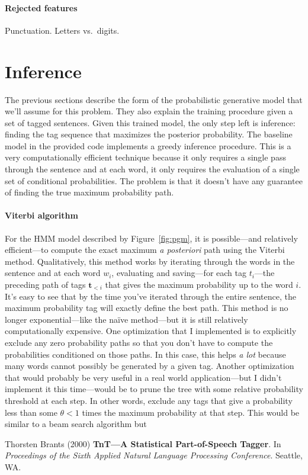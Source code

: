 \documentclass[11pt]{article}
\newcommand{\fig}[1]{Figure~\ref{fig:#1}}
\newcommand{\bvec}[1]{\ensuremath{\boldsymbol{#1}}}
\begin{document}
\paragraph{Rejected features}
Punctuation. Letters vs.\ digits.

\section{Inference}

The previous sections describe the form of the probabilistic generative model
that we'll assume for this problem.
They also explain the training procedure given a set of tagged sentences.
Given this trained model, the only step left is inference: finding the tag
sequence that maximizes the posterior probability.
The baseline model in the provided code implements a greedy inference
procedure.
This is a very computationally efficient technique because it only requires a
single pass through the sentence and at each word, it only requires the
evaluation of a single set of conditional probabilities.
The problem is that it doesn't have any guarantee of finding the true maximum
probability path.

\paragraph{Viterbi algorithm}
For the HMM model described by \fig{pgm}, it is possible---and relatively
efficient---to compute the exact maximum \emph{a posteriori} path using the
Viterbi method.
Qualitatively, this method works by iterating through the words in the
sentence and at each word $w_i$, evaluating and saving---for each tag
$t_i$---the preceding path of tags $\bvec{t}_{<i}$ that gives the maximum
probability up to the word $i$.
It's easy to see that by the time you've iterated through the entire sentence,
the maximum probability tag will exactly define the best path.
This method is no longer exponential---like the na\"ive method---but it is
still relatively computationally expensive.
One optimization that I implemented is to explicitly exclude any zero
probability paths so that you don't have to compute the probabilities
conditioned on those paths.
In this case, this helps \emph{a lot} because many words cannot possibly be
generated by a given tag.
Another optimization that would probably be very useful in a real world
application---but I didn't implement it this time---would be to prune the tree
with some relative probability threshold at each step.
In other words, exclude any tags that give a probability less than some
$\theta < 1$ times the maximum probability at that step.
This would be similar to a beam search algorithm but

\begin{thebibliography}{}\raggedright

 Thorsten Brants (2000)
\textbf{TnT---A Statistical Part-of-Speech Tagger}.
In \emph{Proceedings of the Sixth Applied Natural Language Processing
Conference}. Seattle, WA.

\end{thebibliography}
\end{document}
